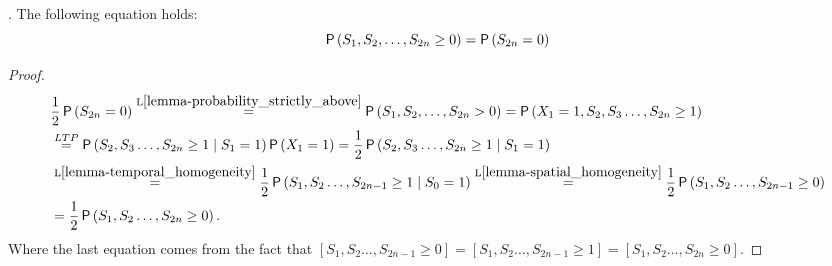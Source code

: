 \begin{comment}
\begin{thm}[Probability of no return and return]\label{thm-no_return=return}
 \Lrws. The following equation holds:
 \[\pr \left( S_1, S_2, \ldots, S_{2n}\neq 0 \right)
 =\pr \left( S_{2n}=0 \right).
 \]
\end{thm}
\begin{proof}
 The event $[S_1, S_2, \ldots, S_{2n}\neq 0]$ can be split into two disjoint events:
 $[S_1, S_2, \ldots, S_{2n}\neq 0]=[S_1, S_2, \ldots, S_{2n} < 0]\cup [S_1, S_2, \ldots, S_{2n} > 0]$.

 By previous theorem (L\ref{thm-no_return=return}) we get that the probability
 of both terms is $\h u_{2n}$.
 Because the the events are disjoint we can sum their probabilities and we get the desired result.
\end{proof}
\end{comment}
\begin{lemma}\label{lemma-probability_above_or_on}
  \Lrws. The following equation holds:
 \[
 \operatorname{\mathsf{P}} \left( S_1, S_2, \ldots, S_{2n} \geq 0 \right)
 =\operatorname{\mathsf{P}} \left( S_{2n}=0 \right)
 \]
\end{lemma}
\begin{proof}
\[
  \begin{split}
    & \frac{1}{2} \operatorname{\mathsf{P}}\left(S_{2n}=0 \right)\overset{\text{L}\ref{lemma-probability_strictly_above}}{=}\operatorname{\mathsf{P}} \left( S_1, S_2, \ldots, S_{2n}>0 \right)
    =\operatorname{\mathsf{P}} \left( X_1=1, S_2, S_3 \ldots, S_{2n}\geq 1 \right)\\
    & \overset{LTP}{=} \operatorname{\mathsf{P}} \left(S_2, S_3 \ldots, S_{2n}\geq 1 \;\middle\vert\; S_1=1\right) \operatorname{\mathsf{P}} \left(X_1=1 \right)
    =\frac{1}{2} \operatorname{\mathsf{P}} \left( S_2, S_3 \ldots, S_{2n}\geq 1 \mid S_1=1 \right)\\
    & \overset{\text{L}\ref{lemma-temporal_homogeneity}}{=}\frac{1}{2} \operatorname{\mathsf{P}} \left( S_1, S_2 \ldots, S_{2n-1}\geq 1 \mid S_0=1 \right)
    \overset{\text{L}\ref{lemma-spatial_homogeneity}}{=}\frac{1}{2} \operatorname{\mathsf{P}} \left( S_1, S_2 \ldots, S_{2n-1}\geq 0 \right)\\
    & =\frac{1}{2} \operatorname{\mathsf{P}} \left( S_1, S_2 \ldots, S_{2n}\geq 0 \right).
  \end{split}
 \]
 Where the last equation comes from the fact that $[S_1, S_2 \ldots, S_{2n-1}\geq 0 ]=[S_1, S_2 \ldots, S_{2n-1}\geq 1]=[S_1, S_2 \ldots, S_{2n} \geq 0 ].$
\end{proof}

